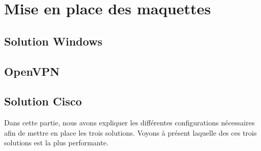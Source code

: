 \section{Mise en place des maquettes}

\subsection{Solution Windows}


\subsection{OpenVPN}


\subsection{Solution Cisco}


Dans cette partie, nous avons expliquer les différentes configurations nécessaires afin de mettre en place les trois solutions. Voyons à présent laquelle des ces trois solutions est la plus performante.

\pagebreak
